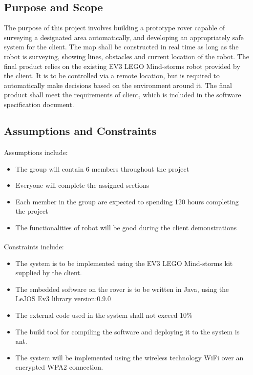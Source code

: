 	\subsection{Purpose and Scope}
The purpose of this project involves building a prototype rover capable of surveying a designated area automatically, and developing an appropriately safe system for the client. The map shall be constructed  in real time as long as the robot is surveying, showing lines, obstacles and current location of the robot. The final product relies on the existing EV3 LEGO Mind-storms robot provided by the client. It is to be controlled via a remote location, but is required to automatically make decisions based on the environment around it. The final product shall meet the requirements of client, which is included in the software specification document.

\subsection{Assumptions and Constraints}
\paragraph{}
Assumptions include:
\begin{itemize}
	\item The group will contain 6 members throughout the project 
	\item Everyone will complete the assigned sections 
	\item Each member in the group are expected to spending 120 hours completing the project
	\item The functionalities of robot will be good during the client demonstrations
	
\end{itemize}
\paragraph{}

Constraints include:
\begin{itemize}
	\item The system is to be implemented using the EV3 LEGO Mind-storms kit supplied by the client.
	\item The embedded software on the rover is to be written in Java, using the LeJOS Ev3 library version:0.9.0
	\item The external code used in the system shall not exceed 10\%
	\item The build tool for compiling the software and deploying it to the system is ant. 
	\item The system will be implemented using the wireless technology WiFi over an encrypted WPA2 connection.
\end{itemize}

